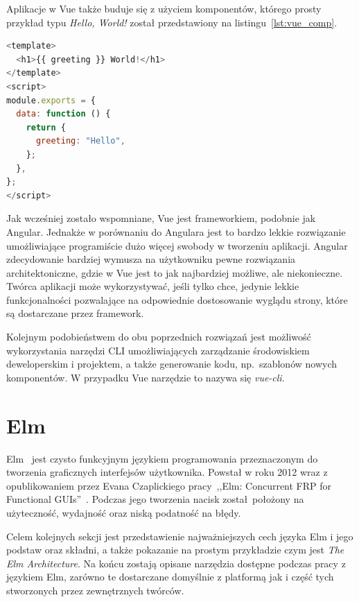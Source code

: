 \documentclass[twoside,a4paper]{report}
\begin{document}
Aplikacje w Vue także buduje się z użyciem komponentów, którego prosty przykład typu \textit{Hello, World!} został przedstawiony na listingu~\ref{lst:vue_comp}.

\begin{lstlisting}[caption={Komponent w Vue},label={lst:vue_comp},language=JavaScript]
<template>
  <h1>{{ greeting }} World!</h1>
</template>
<script>
module.exports = {
  data: function () {
    return {
      greeting: "Hello",
    };
  },
};
</script>
\end{lstlisting}

Jak wcześniej zostało wspomniane, Vue jest frameworkiem, podobnie jak Angular.
Jednakże w porównaniu do Angulara jest to bardzo lekkie rozwiązanie umożliwiające programiście dużo więcej swobody w tworzeniu aplikacji.
Angular zdecydowanie bardziej wymusza na użytkowniku pewne rozwiązania architektoniczne, gdzie w Vue jest to jak najbardziej możliwe, ale niekonieczne.
Twórca aplikacji może wykorzystywać, jeśli tylko chce, jedynie lekkie funkcjonalności pozwalające na odpowiednie dostosowanie wyglądu strony, które są dostarczane przez framework.

Kolejnym podobieństwem do obu poprzednich rozwiązań jest możliwość wykorzystania narzędzi CLI umożliwiających zarządzanie środowiskiem deweloperskim i projektem, a także generowanie kodu, np.~szablonów nowych komponentów.
W przypadku Vue narzędzie to nazywa się \textit{vue-cli}.


\chapter{Elm}
Elm~\cite{elmdocs} jest czysto funkcyjnym językiem programowania przeznaczonym do tworzenia graficznych interfejsów użytkownika.
Powstał w roku 2012 wraz z opublikowaniem przez Evana Czaplickiego pracy~,,Elm: Concurrent FRP for Functional GUIs''~\cite{Czaplicki2012ElmC}.
Podczas jego tworzenia nacisk został położony na użyteczność, wydajność oraz niską podatność na błędy.

Celem kolejnych sekcji jest przedstawienie najważniejszych cech języka Elm i jego podstaw oraz składni, a także pokazanie na prostym przykładzie czym jest \textit{The Elm Architecture}.
Na końcu zostają opisane narzędzia dostępne podczas pracy z językiem Elm, zarówno te dostarczane domyślnie z platformą jak i część tych stworzonych przez zewnętrznych twórców.
\end{document}
